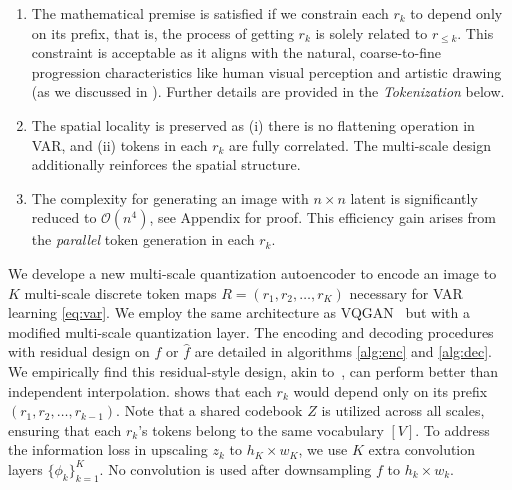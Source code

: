 \begin{enumerate}[label=\arabic*),topsep=0.7pt,itemsep=2pt,leftmargin=20pt]
\item The mathematical premise is satisfied if we constrain each $r_k$ to depend only on its prefix, that is, the process of getting $r_k$ is solely related to $r_{\le k}$.
This constraint is acceptable as it aligns with the natural, coarse-to-fine progression characteristics like human visual perception and artistic drawing (as we discussed in ).
Further details are provided in the \textit{Tokenization} below.

\item The spatial locality is preserved as (i) there is no flattening operation in VAR, and (ii) tokens in each $r_k$ are fully correlated. The multi-scale design additionally reinforces the spatial structure.

\item The complexity for generating an image with $n\times n$ latent is significantly reduced to $\mathcal{O}(n^4)$, see Appendix for proof.
This efficiency gain arises from the \textit{parallel} token generation in each $r_k$.
\end{enumerate}

We develope a new multi-scale quantization autoencoder to encode an image to $K$ multi-scale discrete token maps $R=(r_1, r_2, \dots, r_K)$ necessary for VAR learning \eqref{eq:var}.
We employ the same architecture as VQGAN~\cite{vqgan} but with a modified multi-scale quantization layer.
The encoding and decoding procedures with residual design on $f$ or $\hat{f}$ are detailed in algorithms \ref{alg:enc} and \ref{alg:dec}.
We empirically find this residual-style design, akin to~\cite{rq}, can perform better than independent interpolation.
 shows that each $r_k$ would depend only on its prefix $(r_1, r_2, \dots, r_{k-1})$.
Note that a shared codebook $Z$ is utilized across all scales, ensuring that each $r_k$'s tokens belong to the same vocabulary $[V]$.
To address the information loss in upscaling $z_k$ to $h_K\times w_K$, we use $K$ extra convolution layers $\{\phi_k\}_{k=1}^K$.
No convolution is used after downsampling $f$ to $h_k\times w_k$.


